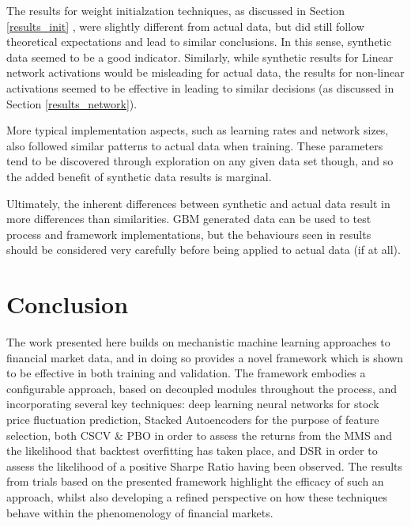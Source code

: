 \documentclass[a4paper,11pt,oneside]{article}
\theoremstyle{plain}
\theoremstyle{definition}
\begin{document}
		The results for weight initialzation techniques, as discussed in Section \ref{results_init} , were slightly different from actual data, but did still follow theoretical expectations and lead to similar conclusions. In this sense, synthetic data seemed to be a good indicator. Similarly, while synthetic results for Linear network activations would be misleading for actual data, the results for non-linear activations seemed to be effective in leading to similar decisions (as discussed in Section \ref{results_network}).\newline
		
		More typical implementation aspects, such as learning rates and network sizes, also followed similar patterns to actual data when training. These parameters tend to be discovered through exploration on any given data set though, and so the added benefit of synthetic data results is marginal.\newline
		
		Ultimately, the inherent differences between synthetic and actual data result in more differences than similarities. GBM generated data can be used to test process and framework implementations, but the behaviours seen in results should be considered very carefully before being applied to actual data (if at all).
	
	
	
	
	
	\newpage
	\section{Conclusion}\label{Conclusion}
	
	The work presented here builds on mechanistic machine learning approaches to financial market data, and in doing so provides a novel framework which is shown to be effective in both training and validation. The framework embodies a configurable approach, based on decoupled modules throughout the process, and incorporating several key techniques: deep learning neural networks for stock price fluctuation prediction, Stacked Autoencoders for the purpose of feature selection, both CSCV \& PBO in order to assess the returns from the MMS and the likelihood that backtest overfitting has taken place, and DSR in order to assess the likelihood of a positive Sharpe Ratio having been observed. The results from trials based on the presented framework highlight the efficacy of such an approach, whilst also developing a refined perspective on how these techniques behave within the phenomenology of financial markets.\newline 
	
\end{document}
